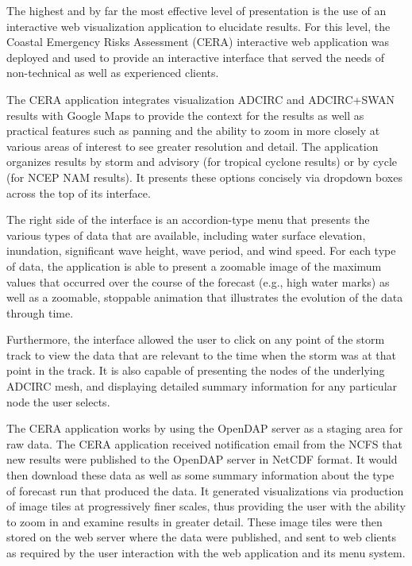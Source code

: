 \documentclass[12pt]{article}
\begin{document}
The highest and by far the most effective level of presentation is 
the use of an interactive web visualization application to elucidate 
results. For this level, the Coastal Emergency Risks Assessment 
(CERA) interactive web application was deployed and used to provide 
an interactive interface that served the needs of non-technical as 
well as experienced clients. 

The CERA application integrates visualization ADCIRC and ADCIRC+SWAN 
results with Google Maps to provide the context for the results as 
well as practical features such as panning and the ability to zoom 
in more closely at various areas of interest to see greater 
resolution and detail. The application organizes results by storm 
and advisory (for tropical cyclone results) or by cycle (for NCEP 
NAM results). It presents these options concisely via dropdown boxes 
across the top of its interface.

The right side of the interface is an accordion-type menu that 
presents the various types of data that are available, including 
water surface elevation, inundation, significant wave height, wave 
period, and wind speed. For each type of data, the application is 
able to present a zoomable image of the maximum values that occurred 
over the course of the forecast (e.g., high water marks) as well as 
a zoomable, stoppable animation that illustrates the evolution of 
the data through time. 

Furthermore, the interface allowed the user to click on any point of 
the storm track to view the data that are relevant to the time when 
the storm was at that point in the track. It is also capable of 
presenting the nodes of the underlying ADCIRC mesh, and displaying 
detailed summary information for any particular node the user 
selects. 

The CERA application works by using the OpenDAP server as a staging 
area for raw data. The CERA application received notification email 
from the NCFS that new results were published to the OpenDAP server 
in NetCDF format. It would then download these data as well as some 
summary information about the type of forecast run that produced the 
data. It generated visualizations via production of image tiles at 
progressively finer scales, thus providing the user with the ability 
to zoom in and examine results in greater detail. These image tiles 
were then stored on the web server where the data were published, 
and sent to web clients as required by the user interaction with the 
web application and its menu system.
\end{document}
